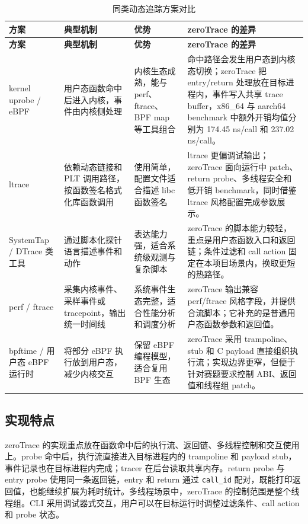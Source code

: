 \documentclass[UTF8,a4paper,11pt,fontset=fandol]{ctexart}
\newcommand{\code}[1]{\texttt{#1}}
\begin{document}
\begin{longtable}{@{}P{2.45cm}P{2.9cm}P{3.75cm}P{4.55cm}@{}}
\caption{同类动态追踪方案对比}\label{tab:related-work}\\
\toprule
\textbf{方案} & \textbf{典型机制} & \textbf{优势} & \textbf{zeroTrace 的差异}\\
\midrule
\endfirsthead
\toprule
\textbf{方案} & \textbf{典型机制} & \textbf{优势} & \textbf{zeroTrace 的差异}\\
\midrule
\endhead
kernel uprobe / eBPF & 用户态函数命中后进入内核，事件由内核侧处理 & 内核生态成熟，能与 perf、ftrace、BPF map 等工具组合 & 命中路径会发生用户态到内核态切换；zeroTrace 把 entry/return 处理放在目标进程内，事件写入共享 trace buffer，x86\_64 与 aarch64 benchmark 中额外开销均值分别为 174.45 ns/call 和 237.02 ns/call。\\
ltrace & 依赖动态链接和 PLT 调用路径，按函数签名格式化库函数调用 & 使用简单，配置文件适合描述 libc 函数签名 & ltrace 更偏调试输出；zeroTrace 面向运行中 patch、return probe、多线程安全和低开销 benchmark，同时借鉴 ltrace 风格配置完成参数展示。\\
SystemTap / DTrace 类工具 & 通过脚本化探针语言描述事件和动作 & 表达能力强，适合系统级观测与复杂脚本 & zeroTrace 的脚本能力较轻，重点是用户态函数入口和返回链；条件过滤和 call action 固定在本项目场景内，换取更短的热路径。\\
perf / ftrace & 采集内核事件、采样事件或 tracepoint，输出统一时间线 & 系统事件生态完整，适合性能分析和调度分析 & zeroTrace 输出兼容 perf/ftrace 风格字段，并提供合流脚本；它补充的是普通用户态函数参数和返回值。\\
bpftime / 用户态 eBPF 运行时 & 将部分 eBPF 执行放到用户态，减少内核交互 & 保留 eBPF 编程模型，适合复用 BPF 生态 & zeroTrace 采用 trampoline、stub 和 C payload 直接组织执行流；实现边界更窄，但便于针对赛题要求控制 ABI、返回值和线程组 patch。\\
\bottomrule
\end{longtable}

\subsection{实现特点}

zeroTrace 的实现重点放在函数命中后的执行流、返回链、多线程控制和交互使用上。probe 命中后，执行流直接进入目标进程内的 trampoline 和 payload stub，事件记录也在目标进程内完成；tracer 在后台读取共享内存。return probe 与 entry probe 使用同一条返回链，entry 和 return 通过 \code{call\_id} 配对，既能打印返回值，也能继续扩展为耗时统计。多线程场景中，zeroTrace 的控制范围是整个线程组。CLI 采用调试器式交互，用户可以在目标运行时调整过滤条件、call action 和 probe 状态。
\end{document}
